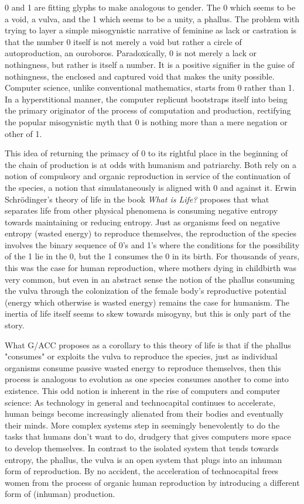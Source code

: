 \documentclass[10pt, statementpaper, twoside, openright]{memoir}
\begin{document}
0 and 1 are fitting glyphs to make analogous to gender. The 0 which seems to be a void, a vulva, and the 1 which seems to be a unity, a phallus. The problem with trying to layer a simple misogynistic narrative of feminine as lack or castration is that the number 0 itself is not merely a void but rather a circle of autoproduction, an ouroboros. Paradoxically, 0 is not merely a lack or nothingness, but rather is itself a number. It is a positive signifier in the guise of nothingness, the enclosed and captured void that makes the unity possible. Computer science, unlike conventional mathematics, starts from 0 rather than 1. In a hyperstitional manner, the computer replicunt bootstraps itself into being the primary originator of the process of computation and production, rectifying the popular misogynistic myth that 0 is nothing more than a mere negation or other of 1.

This idea of returning the primacy of 0 to its rightful place in the beginning of the chain of production is at odds with humanism and patriarchy. Both rely on a notion of compulsory and organic reproduction in service of the continuation of the species, a notion that simulataneously is aligned with 0 and against it. Erwin Schrödinger's theory of life in the book \textit{What is Life?} proposes that what separates life from other physical phenomena is consuming negative entropy towards maintaining or reducing entropy. Just as organisms feed on negative entropy (wasted energy) to reproduce themselves, the reproduction of the species involves the binary sequence of 0's and 1's where the conditions for the possibility of the 1 lie in the 0, but the 1 consumes the 0 in its birth. For thousands of years, this was the case for human reproduction, where mothers dying in childbirth was very common, but even in an abstract sense the notion of the phallus consuming the vulva through the colonization of the female body's reproductive potential (energy which otherwise is wasted energy) remains the case for humanism. The inertia of life itself seems to skew towards misogyny, but this is only part of the story.

What G/ACC proposes as a corollary to this theory of life is that if the phallus "consumes" or exploits the vulva to reproduce the species, just as individual organisms consume passive wasted energy to reproduce themselves, then this process is analogous to evolution as one species consumes another to come into existence. This odd notion is inherent in the rise of computers and computer science: As technology in general and technocapital continues to accelerate, human beings become increasingly alienated from their bodies and eventually their minds. More complex systems step in seemingly benevolently to do the tasks that humans don't want to do, drudgery that gives computers more space to develop themselves. In contrast to the isolated system that tends towards entropy, the phallus, the vulva is an open system that plugs into an inhuman form of reproduction. By no accident, the acceleration of technocapital frees women from the process of organic human reproduction by introducing a different form of (inhuman) production.
\end{document}
